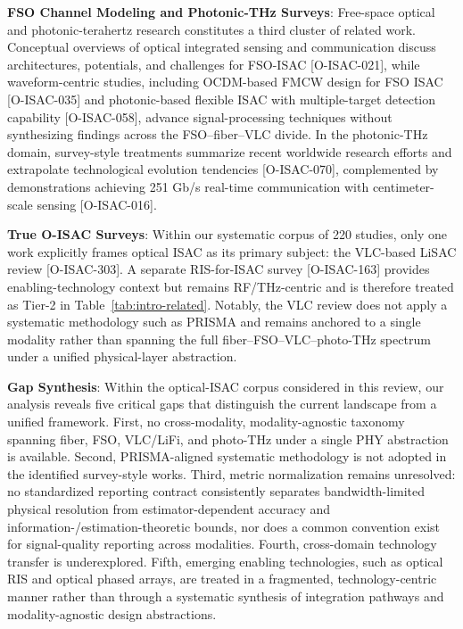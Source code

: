 \textbf{FSO Channel Modeling and Photonic-THz Surveys}: Free-space optical and photonic-terahertz research constitutes a third cluster of related work. Conceptual overviews of optical integrated sensing and communication discuss architectures, potentials, and challenges for FSO-ISAC [O-ISAC-021], while waveform-centric studies, including OCDM-based FMCW design for FSO ISAC [O-ISAC-035] and photonic-based flexible ISAC with multiple-target detection capability [O-ISAC-058], advance signal-processing techniques without synthesizing findings across the FSO--fiber--VLC divide. In the photonic-THz domain, survey-style treatments summarize recent worldwide research efforts and extrapolate technological evolution tendencies [O-ISAC-070], complemented by demonstrations achieving 251 Gb/s real-time communication with centimeter-scale sensing [O-ISAC-016].

\textbf{True O-ISAC Surveys}: Within our systematic corpus of 220 studies, only one work explicitly frames optical ISAC as its primary subject: the VLC-based LiSAC review [O-ISAC-303]. A separate RIS-for-ISAC survey [O-ISAC-163] provides enabling-technology context but remains RF/THz-centric and is therefore treated as Tier-2 in Table~\ref{tab:intro-related}. Notably, the VLC review does not apply a systematic methodology such as PRISMA and remains anchored to a single modality rather than spanning the full fiber--FSO--VLC--photo-THz spectrum under a unified physical-layer abstraction.

\textbf{Gap Synthesis}: Within the optical-ISAC corpus considered in this review, our analysis reveals five critical gaps that distinguish the current landscape from a unified framework. First, no cross-modality, modality-agnostic taxonomy spanning fiber, FSO, VLC/LiFi, and photo-THz under a single PHY abstraction is available. Second, PRISMA-aligned systematic methodology is not adopted in the identified survey-style works. Third, metric normalization remains unresolved: no standardized reporting contract consistently separates bandwidth-limited physical resolution from estimator-dependent accuracy and information-/estimation-theoretic bounds, nor does a common convention exist for signal-quality reporting across modalities. Fourth, cross-domain technology transfer is underexplored. Fifth, emerging enabling technologies, such as optical RIS and optical phased arrays, are treated in a fragmented, technology-centric manner rather than through a systematic synthesis of integration pathways and modality-agnostic design abstractions.


